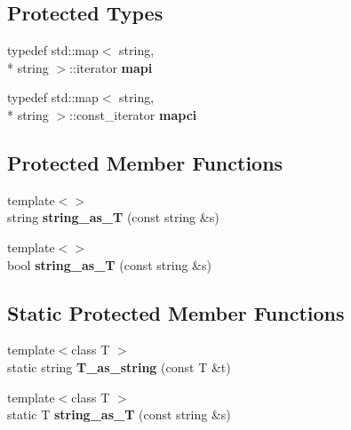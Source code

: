\subsection*{Protected Types}
\begin{DoxyCompactItemize}
\item 
\hypertarget{classConfigFile_a91de4778982f558673be7465f33750f5}{typedef std\+::map$<$ string, \\*
string $>$\+::iterator {\bfseries mapi}}\label{classConfigFile_a91de4778982f558673be7465f33750f5}

\item 
\hypertarget{classConfigFile_af606aa032e366450b81792da67c984fc}{typedef std\+::map$<$ string, \\*
string $>$\+::const\+\_\+iterator {\bfseries mapci}}\label{classConfigFile_af606aa032e366450b81792da67c984fc}

\end{DoxyCompactItemize}
\subsection*{Protected Member Functions}
\begin{DoxyCompactItemize}
\item 
\hypertarget{classConfigFile_a7d2b8acc0f7c2ea7892ef2e77d925ba9}{{\footnotesize template$<$$>$ }\\string {\bfseries string\+\_\+as\+\_\+\+T} (const string \&s)}\label{classConfigFile_a7d2b8acc0f7c2ea7892ef2e77d925ba9}

\item 
\hypertarget{classConfigFile_adda9a4a7de5eef0151e45b5874ddf50d}{{\footnotesize template$<$$>$ }\\bool {\bfseries string\+\_\+as\+\_\+\+T} (const string \&s)}\label{classConfigFile_adda9a4a7de5eef0151e45b5874ddf50d}

\end{DoxyCompactItemize}
\subsection*{Static Protected Member Functions}
\begin{DoxyCompactItemize}
\item 
\hypertarget{classConfigFile_a9855bff7ed5af9aa408ac06fc7ab4c09}{{\footnotesize template$<$class T $>$ }\\static string {\bfseries T\+\_\+as\+\_\+string} (const T \&t)}\label{classConfigFile_a9855bff7ed5af9aa408ac06fc7ab4c09}

\item 
\hypertarget{classConfigFile_a59c6ab56cdfa23a29a38bf3eea1ededf}{{\footnotesize template$<$class T $>$ }\\static T {\bfseries string\+\_\+as\+\_\+\+T} (const string \&s)}\label{classConfigFile_a59c6ab56cdfa23a29a38bf3eea1ededf}

\end{DoxyCompactItemize}
